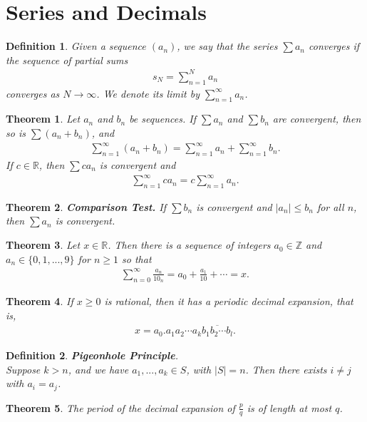 \documentclass{article}
\theoremstyle{sltheorem}
\newtheorem{definition}{Definition}[section]
\newtheorem{theorem}{Theorem}[section]
\newcommand{\R}{\mathbb{R}}
\newcommand*\lneg[1]{\overline{#1}}
\newcommand*\B[1]{\textbf{#1}}
\begin{document}
\section{Series and Decimals}
\begin{definition}
    Given a sequence $(a_n)$, we say that the series $\sum a_n$ converges if the sequence of partial sums
    \begin{align*}
        s_N=\sum_{n=1}^N a_n
    \end{align*}
    converges as $N\to\infty$. We denote its limit by $\sum_{n=1}^\infty a_n$.
\end{definition}
\begin{theorem}
    Let $a_n$ and $b_n$ be sequences. If $\sum a_n$ and $\sum b_n$ are convergent, then so is $\sum (a_n+b_n)$, and
    \begin{align*}
        \sum_{n=1}^\infty (a_n+b_n) = \sum_{n=1}^\infty a_n+ \sum_{n=1}^\infty b_n.
    \end{align*}
    If $c\in\R$, then $\sum ca_n$ is convergent and
    \begin{align*}
        \sum_{n=1}^\infty ca_n = c\sum_{n=1}^\infty a_n.
    \end{align*}
\end{theorem}
\begin{theorem}
    \B{Comparison Test.} If $\sum b_n$ is convergent and $|a_n|\leq b_n$ for all $n$, then $\sum a_n$ is convergent.
\end{theorem}
\begin{theorem}
    Let $x\in\R$. Then there is a sequence of integers $a_0\in\mathbb{Z}$ and $a_n\in\{0,1,...,9\}$ for $n\geq 1$ so that
    \begin{align*}
        \sum_{n=0}^\infty \frac{a_n}{10_n}=a_0+\frac{a_1}{10}+\cdots = x.
    \end{align*}
\end{theorem}
\begin{theorem}
    If $x\geq 0$ is rational, then it has a periodic decimal expansion, that is,
    \begin{align*}
        x=a_0.a_1a_2\cdots a_k\lneg{b_1b_2\cdots b_l}.
    \end{align*}
\end{theorem}
\begin{definition}
    \B{Pigeonhole Principle}.\\
    Suppose $k>n$, and we have $a_1,...,a_k\in S$, with $|S|=n$. Then there exists $i\not=j$ with $a_i=a_j$.
\end{definition}
\begin{theorem}
    The period of the decimal expansion of $\frac{p}{q}$ is of length at most $q$.
\end{theorem}
\end{document}
